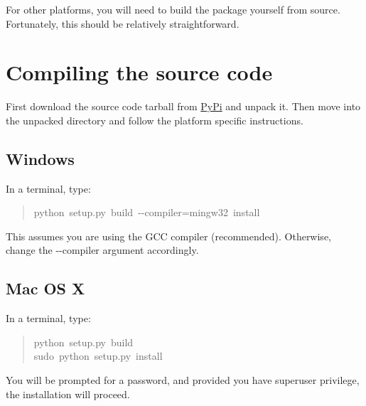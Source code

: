 For other platforms, you will need to build the package yourself from source. 
Fortunately, this should be relatively straightforward.



\hypertarget{compiling-the-source-code}{}
\section*{Compiling the source code}

First download the source code tarball from \href{http://pypi.python.org/pypi/pymc/}{PyPi} and unpack it. Then move 
into the unpacked directory and follow the platform specific instructions.



\hypertarget{windows}{}
\subsection*{Windows}

In a terminal, type:
\begin{quote}{\ttfamily \raggedright \noindent
python~setup.py~build~-{}-compiler=mingw32~install
}\end{quote}

This assumes you are using the GCC compiler (recommended). Otherwise, 
change the -{}-compiler argument accordingly.



\hypertarget{mac-os-x}{}
\subsection*{Mac OS X}

In a terminal, type:
\begin{quote}{\ttfamily \raggedright \noindent
python~setup.py~build~\\
sudo~python~setup.py~install
}\end{quote}

You will be prompted for a password, and provided you have superuser privilege, 
the installation will proceed.




